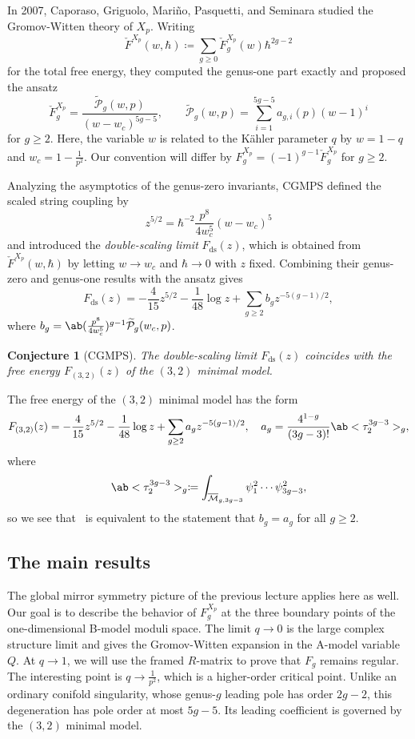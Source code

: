\documentclass{amsart}
\newtheorem{conj}[thm]{Conjecture}
\theoremstyle{definition}
\theoremstyle{remark}
\theoremstyle{plain}
\theoremstyle{definition}
\theoremstyle{remark}
\newcommand{\Mbar}{\overline{\mathcal{M}}}
\newcommand{\mc}[1]{\mathcal{#1}}
\newcommand{\mr}[1]{\mathrm{#1}}
\newcommand{\wt}[1]{\widetilde{#1}}
\newcommand{\1}{\mathbf{1}}
\newcommand{\2}{\mathbf{2}}
\newcommand{\3}{\mathbf{3}}
\begin{document}
In 2007, Caporaso, Griguolo, Mari\~{n}o, Pasquetti, and Seminara studied the Gromov-Witten theory of \(X_p\). Writing
\[ \check{F}^{X_p}(w,\hbar) \coloneqq \sum_{g \geq 0} \check{F}_g^{X_p}(w) \hbar^{2g-2} \]
for the total free energy, they computed the genus-one part exactly and proposed the ansatz
\begin{equation}\label{eqn:cgmps ansatz}
    \check{F}_g^{X_p} = \frac{\wt{\mc{P}}_g(w,p)}{(w-w_c)^{5g-5}}, \qquad \wt{\mc{P}}_g(w,p) = \sum_{i=1}^{5g-5} a_{g,i}(p)(w-1)^i
\end{equation}
for \(g \geq 2\). Here, the variable \(w\) is related to the Kähler parameter \(q\) by \(w = 1-q\) and \(w_c = 1 - \frac{1}{p^2}\). Our convention will differ by \(F_g^{X_p} = (-1)^{g-1}\check{F}_g^{X_p}\) for \(g \geq 2\).

Analyzing the asymptotics of the genus-zero invariants, CGMPS defined the scaled string coupling by
\[ z^{5/2} = \hbar^{-2} \frac{p^8}{4w_c^5}(w-w_c)^5 \]
and introduced the \textit{double-scaling limit} \(F_{\mr{ds}}(z)\), which is obtained from \(\check{F}^{X_p}(w,\hbar)\) by letting \(w \to w_c\) and \(\hbar \to 0\) with \(z\) fixed. Combining their genus-zero and genus-one results with the ansatz gives
\[ F_{\mr{ds}}(z) = -\frac{4}{15}z^{5/2} - \frac{1}{48}\log z + \sum_{g \geq 2} b_g z^{-5(g-1)/2}, \]
where \(b_g = \ab(\frac{p^8}{4w_c^5})^{g-1}\wt{\mc{P}}_g(w_c,p)\).

\begin{conj}[CGMPS]%
\label{conj:cgmps}
    The double-scaling limit \(F_{\mr{ds}}(z)\) coincides with the free energy \(F_{(3,2)}(z)\) of the \((3,2)\) minimal model.
\end{conj}

The free energy of the \((3,2)\) minimal model has the form
\[ F_{(3,2)}(z) = -\frac{4}{15}z^{5/2} - \frac{1}{48}\log z + \sum_{g\geq2} a_g z^{-5(g-1)/2}, \quad a_g = \frac{4^{1-g}}{(3g-3)!}\ab<\tau_2^{3g-3}>_g, \]
where
\[ \ab<\tau_2^{3g-3}>_g \coloneqq \int_{\Mbar_{g,3g-3}} \psi_1^2 \cdots \psi_{3g-3}^2, \]
so we see that~ is equivalent to the statement that \(b_g = a_g\) for all \(g \geq 2\).

\subsection{The main results}%
\label{sub:The main results (Guo local P1)}

The global mirror symmetry picture of the previous lecture applies here as well. Our goal is to describe the behavior of \(F_g^{X_p}\) at the three boundary points of the one-dimensional B-model moduli space. The limit \(q \to 0\) is the large complex structure limit and gives the Gromov-Witten expansion in the A-model variable \(Q\). At \(q \to 1\), we will use the framed \(R\)-matrix to prove that \(F_g\) remains regular. The interesting point is \(q \to \frac{1}{p^2}\), which is a higher-order critical point. Unlike an ordinary conifold singularity, whose genus-\(g\) leading pole has order \(2g-2\), this degeneration has pole order at most \(5g-5\). Its leading coefficient is governed by the \((3,2)\) minimal model.
\end{document}
